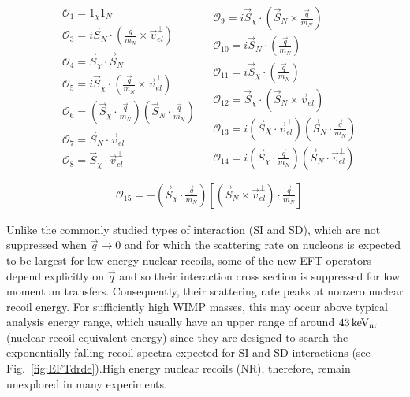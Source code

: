 \begingroup
\belowdisplayskip=0pt
\begin{align*}
\begin{split} 
&\mathcal{O}_1 = 1_{\chi} 1_N  \\
&\mathcal{O}_3 = i\vec{S}_N\cdot (\frac{\vec{q}}{m_N}\times\vec{v}_{el}^{\perp}) \\
&\mathcal{O}_4 = \vec{S}_{\chi}\cdot \vec{S}_N \\
&\mathcal{O}_5 = i\vec{S}_{\chi}\cdot (\frac{\vec{q}}{m_N}\times\vec{v}_{el}^{\perp}) \\
&\mathcal{O}_6 = (\vec{S}_{\chi} \cdot \frac{\vec{q}}{m_N})(\vec{S}_N \cdot \frac{\vec{q}}{m_N}) \\
&\mathcal{O}_7 = \vec{S}_N \cdot \vec{v}_{el}^{\perp} \\
&\mathcal{O}_8 = \vec{S}_{\chi} \cdot \vec{v}_{el}^{\perp}  \\
\end{split}
\begin{split}
&\mathcal{O}_9 = i\vec{S}_{\chi} \cdot(\vec{S}_N \times \frac{\vec{q}}{m_N}) \\
&\mathcal{O}_{10} = i\vec{S}_N \cdot (\frac{\vec{q}}{m_N}) \\
&\mathcal{O}_{11} = i\vec{S}_{\chi} \cdot (\frac{\vec{q}}{m_N}) \\
&\mathcal{O}_{12} = \vec{S}_\chi \cdot (\vec{S}_N \times \vec{v}_{el}^{\perp}) \\
&\mathcal{O}_{13} = i(\vec{S}\chi \cdot \vec{v}_{el}^{\perp})(\vec{S}_N \cdot \frac{\vec{q}}{m_N})\\
&\mathcal{O}_{14} = i(\vec{S}_\chi \cdot \frac{\vec{q}}{m_N})(\vec{S}_N \cdot \vec{v}_{el}^{\perp}) \\
\end{split}
\end{align*}
\endgroup
\begingroup
\abovedisplayskip=0pt
\begin{align}
&\mathcal{O}_{15} = -(\vec{S}_\chi \cdot \frac{\vec{q}}{m_N})\left[(\vec{S}_N \times \vec{v}_{el}^{\perp})\cdot \frac{\vec{q}}{m_N}\right]
\label{eq:OpDef}
\end{align}
\endgroup

Unlike the commonly studied types of interaction (SI and SD), which are not suppressed when $\vec{q} \rightarrow 0$ and for which the scattering rate on nucleons is expected to be largest for low energy nuclear recoils, some of the new EFT operators depend explicitly on $\vec{q}$ and so their interaction cross section is suppressed for low momentum transfers. Consequently, their scattering rate peaks at nonzero nuclear recoil energy. For sufficiently high WIMP masses, this may occur above typical analysis energy range, which usually have an upper range of around $ 43\,\mathrm{keV_\mathrm{nr}}$ (nuclear recoil equivalent
energy) since they are designed to search the exponentially falling recoil spectra expected for SI and SD interactions (see Fig.~\ref{fig:EFTdrde}).High energy nuclear recoils (NR), therefore, remain unexplored in many experiments.

